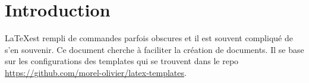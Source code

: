 \section{Introduction}

\LaTeX est rempli de commandes parfois obscures et il est souvent compliqué de s'en souvenir.
Ce document cherche à faciliter la création de documents.
Il se base sur les configurations des templates qui se trouvent dans le repo \url{https://github.com/morel-olivier/latex-templates}.